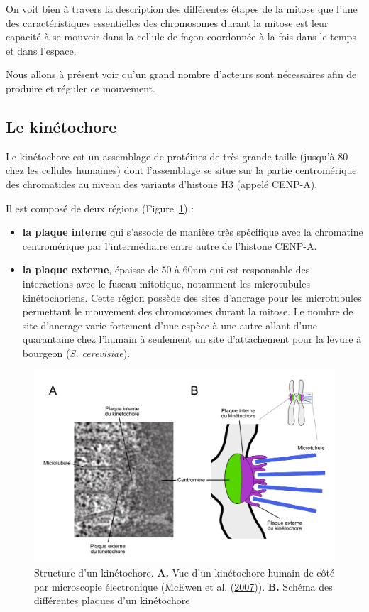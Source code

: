 \documentclass[12pt,a4paper,twoside,openright]{book}
\begin{document}
On voit bien à travers la description des différentes étapes de la
mitose que l'une des caractéristiques essentielles des chromosomes
durant la mitose est leur capacité à se mouvoir dans la cellule de façon
coordonnée à la fois dans le temps et dans l'espace.

Nous allons à présent voir qu'un grand nombre d'acteurs sont nécessaires
afin de produire et réguler ce mouvement.

\subsection{Le kinétochore}\label{le-kinuxe9tochore}

Le kinétochore est un assemblage de protéines de très grande taille
(jusqu'à 80 chez les cellules humaines) dont l'assemblage se situe sur
la partie centromérique des chromatides au niveau des variants d'histone
H3 (appelé CENP-A).

Il est composé de deux régions (Figure~\ref{fig:kt}) :

\begin{itemize}
\item
  \textbf{la plaque interne} qui s'associe de manière très spécifique
  avec la chromatine centromérique par l'intermédiaire entre autre de
  l'histone CENP-A.
\item
  \textbf{la plaque externe}, épaisse de 50 à 60nm qui est responsable
  des interactions avec le fuseau mitotique, notamment les microtubules
  kinétochoriens. Cette région possède des sites d'ancrage pour les
  microtubules permettant le mouvement des chromosomes durant la mitose.
  Le nombre de site d'ancrage varie fortement d'une espèce à une autre
  allant d'une quarantaine chez l'humain à seulement un site
  d'attachement pour la levure à bourgeon (\emph{S. cerevisiae}).
\end{itemize}

\begin{figure}[htbp]
\centering
\includegraphics{figures/intro/kt.png}
\caption[Structure d'un kinétochore]{\label{fig:kt}Structure d'un
kinétochore. \textbf{A.} Vue d'un kinétochore humain de côté par
microscopie électronique (McEwen et al.
(\hyperref[ref-McEwen2007]{2007})). \textbf{B.} Schéma des différentes
plaques d'un kinétochore}
\end{figure}
\end{document}
